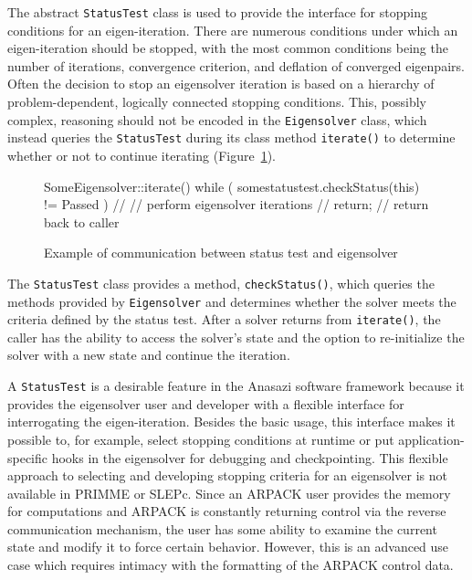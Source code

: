 \documentclass[acmtoms]{acmtrans2m}
\newcommand{\aspace}[1]{\texttt{#1}}
\begin{document}
The abstract \aspace{StatusTest} class is used to provide the interface for stopping 
conditions for an eigen-iteration. There are numerous conditions under which an eigen-iteration 
should be stopped, with the most common conditions being the number of iterations,
convergence criterion, and deflation of converged eigenpairs.
Often the decision to stop an eigensolver iteration is based on a hierarchy 
of problem-dependent, logically connected stopping conditions.
This, possibly complex, reasoning should not be encoded in the \aspace{Eigensolver} class,
which instead queries the \aspace{StatusTest} during its class method \aspace{iterate()} to determine 
whether or not to continue iterating (Figure~\ref{fig:comm}).
\begin{figure}[htb]
\begin{center}
\begin{boxedverbatim}
SomeEigensolver::iterate() {
  while ( somestatustest.checkStatus(this) != Passed ) {
    //
    // perform eigensolver iterations
    //
  }
  return;  // return back to caller
}
\end{boxedverbatim}
\end{center}
\caption{Example of communication between status test and eigensolver}
\label{fig:comm}
\end{figure}
The \aspace{StatusTest} class provides a method, \verb!checkStatus()!, which queries the methods provided by
\aspace{Eigensolver} and determines whether the solver meets the criteria defined by the 
status test. After a solver returns from \verb!iterate()!, the caller has the ability to access the
solver's state and the option to re-initialize the solver with a new state and continue
the iteration.

A \aspace{StatusTest} is a desirable feature in the Anasazi software framework because it
provides the eigensolver user and developer with a flexible interface for interrogating
the eigen-iteration. Besides the basic usage, this interface makes it possible to, for
example, select stopping conditions at runtime or put application-specific hooks in the
eigensolver for debugging and checkpointing. This flexible approach to selecting and
developing stopping criteria for an eigensolver is not available in PRIMME or SLEPc.
Since an ARPACK user provides the memory for computations and ARPACK is constantly
returning control via the reverse communication mechanism, the user has some ability to
examine the current state and modify it to force certain behavior. However, this is an
advanced use case which requires intimacy with the formatting of the ARPACK control data.
\end{document}
